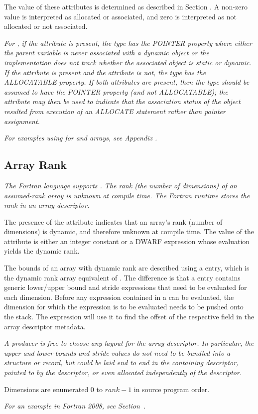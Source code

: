 The value of these attributes is determined as described in
Section .
A non-zero value is interpreted as allocated or associated,
and zero is interpreted as not allocated or not associated.

\textit{For ,
if the \DWATassociated{}
attribute is present,
the type has the POINTER property where either the parent
variable is never associated with a dynamic object or the
implementation does not track whether the associated object
is static or dynamic. If the \DWATallocated{} attribute is
present and the \DWATassociated{} attribute is not, the type
has the ALLOCATABLE property. If both attributes are present,
then the type should be assumed to have the POINTER property
(and not ALLOCATABLE); the \DWATallocated{} attribute may then
be used to indicate that the association status of the object
resulted from execution of an ALLOCATE statement rather than
pointer assignment.}

\textit{For examples using
\DWATallocated{} for  and
arrays,
see Appendix .}

\subsection{Array Rank}
\label{chap:DWATrank}
\textit{The Fortran language supports . The
  rank (the number of dimensions) of an assumed-rank array is unknown
  at compile time. The Fortran runtime stores the rank in an array
  descriptor.}

The presence of
the\hypertarget{chap:DWATrankofdynamicarray}{\DWATrankINDX}
attribute indicates that an array's rank
(number of dimensions) is dynamic, and therefore unknown at compile
time. The value of the \DWATrankDEFN{} attribute is either an integer constant
or a DWARF expression whose evaluation yields the dynamic rank.

The bounds of an array with dynamic rank are described using a
\DWTAGgenericsubrange{} entry, which
is the dynamic rank array equivalent of
\DWTAGsubrangetype. The
difference is that a \DWTAGgenericsubrange{} entry contains generic
lower/upper bound and stride expressions that need to be evaluated for
each dimension. Before any expression contained in a
\DWTAGgenericsubrange{} can be evaluated, the dimension for which the
expression is to be evaluated needs to be pushed onto the stack. The
expression will use it to find the offset of the respective field in
the array descriptor metadata.

\textit{A producer is free to choose any layout for the
  array descriptor. In particular, the upper and lower bounds and
  stride values do not need to be bundled into a structure or record,
  but could be laid end to end in the containing descriptor, pointed
  to by the descriptor, or even allocated independently of the
  descriptor.}

Dimensions are enumerated $0$ to $\mathit{rank}-1$ in source program
order.

\textit{For an example in Fortran 2008, see
  Section~.}
